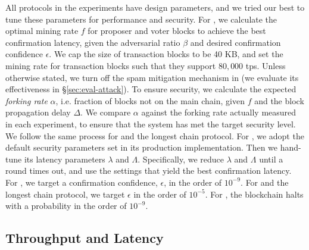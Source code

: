 
{} All protocols in the experiments have design parameters, and we tried our best to tune these parameters for performance and security. For \prism, we calculate the optimal mining rate $f$ for proposer and voter blocks to achieve the best confirmation latency, given the adversarial ratio $\beta$ and desired confirmation confidence $\epsilon$. We cap the size of transaction blocks to be 40 KB, and set the mining rate for transaction blocks such that they support $80,000$ tps. Unless otherwise stated, we turn off the spam mitigation mechanism in \prism (we evaluate its effectiveness in \S\ref{sec:eval-attack}).  To ensure security, we calculate the expected {\em forking rate} $\alpha$, i.e. fraction of blocks not on the main chain, given $f$ and the block propagation delay $\Delta$. We compare $\alpha$ against the forking rate actually measured in each experiment, to ensure that the system has met the target security level. We follow the same process for \bng and the longest chain protocol. For \algorand, we adopt the default security parameters set in its production implementation. Then we hand-tune its latency parameters $\lambda$ and $\Lambda$. Specifically, we reduce $\lambda$ and $\Lambda$ until a round times out, and use the settings that yield the best confirmation latency. For \prism, we target a confirmation confidence, $\epsilon$, in the order of $10^{-9}$. For \bng and the longest chain protocol, we target $\epsilon$ in the order of $10^{-5}$. For \algorand, the blockchain halts with a probability in the order of $10^{-9}$.

\subsection{Throughput and Latency}
\label{sec:eval-performance}

